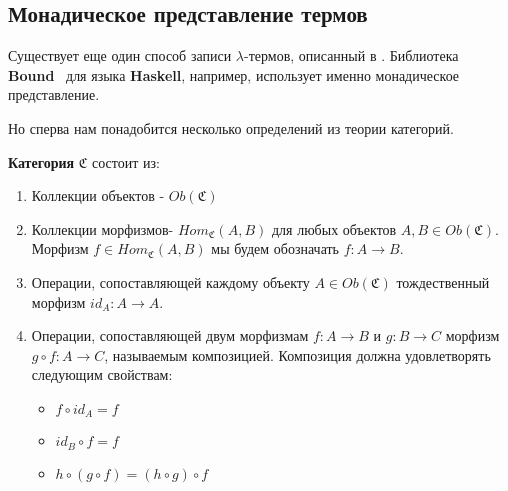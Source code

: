 \subsection{Монадическое представление термов}

Существует еще один способ записи $\lambda$-термов, описанный в \cite{bird1999bruijn}. Библиотека \textbf{Bound}~\cite{bound} для языка \textbf{Haskell}, например, использует именно монадическое представление.

Но сперва нам понадобится несколько определений из теории категорий.

%
%
%

\begin{definition}
  \textbf{Категория} $\mathfrak{C}$ состоит из:
  \begin{enumerate}
    \item Коллекции объектов - $Ob(\mathfrak{C})$
    \item Коллекции морфизмов- $Hom_{\mathfrak{C}}(A, B)$ для любых объектов $A, B \in Ob(\mathfrak{C})$. Морфизм $f \in Hom_{\mathfrak{C}}(A, B)$ мы будем обозначать $f : A \to B$.
    \item Операции, сопоставляющей каждому объекту $A \in Ob(\mathfrak{C})$ тождественный морфизм $id_{A} : A \to A$.
    \item Операции, сопоставляющей двум морфизмам $f : A \to B$ и $g : B \to C$ морфизм $g \circ f : A \to C$, называемым композицией. Композиция должна удовлетворять следующим свойствам:
      \begin{itemize}
        \item $f \circ id_{A} = f$
        \item $id_{B} \circ f = f$
        \item $h \circ (g \circ f) = (h \circ g) \circ f$
      \end{itemize}
  \end{enumerate}
\end{definition}


